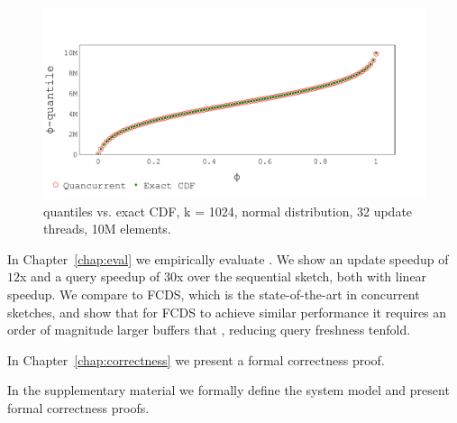 \begin{figure}[htp]
    \centering
    \includegraphics[width=\linewidth,trim={0cm 0.3cm 0cm 1.5cm},clip]
    {graphics/graphs/accuracy/Oracle_Quancurrent_blocking_numa_cdf_normal_k1024_b16_keys10M_runs1_uT32_qT1_snapshot1_17-09-2022_07-00-49.pdf}
    \caption{\mysketch quantiles vs. exact CDF, k = 1024, normal distribution, 32 update threads, 10M elements.}
    \label{fig:intro-query-accuracy}
\end{figure}


In Chapter~\ref{chap:eval} we empirically evaluate \mysketch. We show an update speedup of $12$x and a query speedup of $30$x over the sequential sketch, both with linear speedup. We compare \mysketch to FCDS, which is the state-of-the-art in concurrent sketches, and show that for FCDS to achieve similar performance it requires an order of magnitude larger buffers that \mysketch, reducing query freshness tenfold.

In Chapter~\ref{chap:correctness} we present a formal correctness proof. 

In the supplementary material we formally define the system model and present formal correctness proofs.

